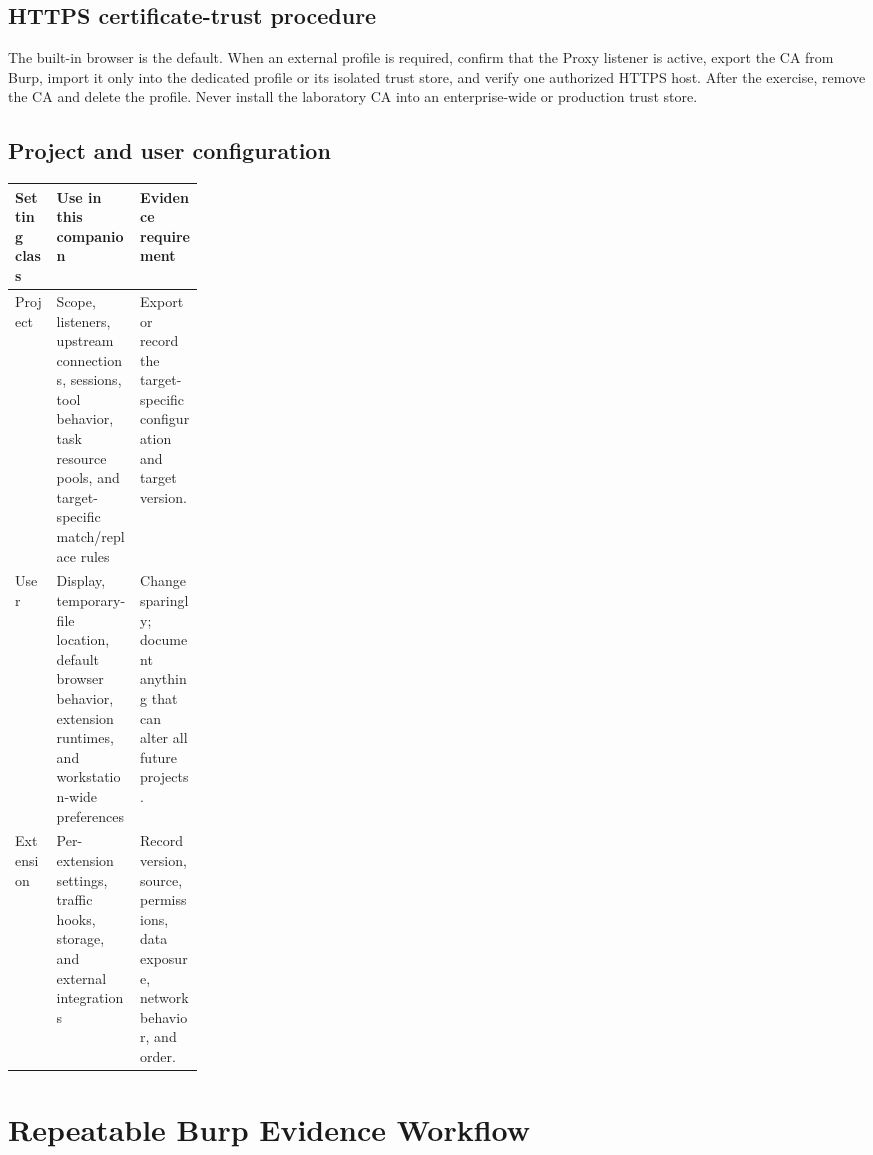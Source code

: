 \documentclass[11pt]{article}
\begin{document}
\subsection{HTTPS certificate-trust procedure}

The built-in browser is the default. When an external profile is required,
confirm that the Proxy listener is active, export the CA from Burp, import it
only into the dedicated profile or its isolated trust store, and verify one
authorized HTTPS host. After the exercise, remove the CA and delete the profile.
Never install the laboratory CA into an enterprise-wide or production trust
store.

\subsection{Project and user configuration}

\begin{tabularx}{\linewidth}{@{}L{0.22\linewidth}Y Y@{}}
\toprule
\textbf{Setting class} & \textbf{Use in this companion} & \textbf{Evidence requirement} \\
\midrule
Project & Scope, listeners, upstream connections, sessions, tool behavior, task resource pools, and target-specific match/replace rules & Export or record the target-specific configuration and target version. \\
User & Display, temporary-file location, default browser behavior, extension runtimes, and workstation-wide preferences & Change sparingly; document anything that can alter all future projects. \\
Extension & Per-extension settings, traffic hooks, storage, and external integrations & Record version, source, permissions, data exposure, network behavior, and order. \\
\bottomrule
\end{tabularx}

\section{Repeatable Burp Evidence Workflow}
\end{document}
